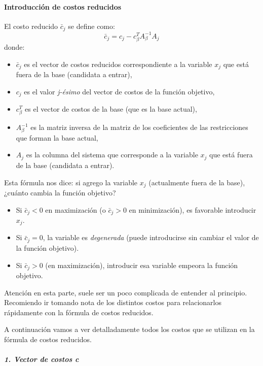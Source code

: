 \paragraph{Introducción de costos reducidos}

El costo reducido \(\bar{c}_j\) se define como:
\[
  \bar{c}_j = c_j - c_\beta^T A_\beta^{-1} A_j
\]
donde:
\begin{itemize}
  \item \(\bar{c}_j\) es el vector de costos reducidos correspondiente a la variable \(x_j\) que está fuera de la base (candidata a entrar),
  \item \(c_j\) es el valor \textit{j-ésimo} del vector de costos de la función objetivo,
  \item \(c_\beta^T\) es el vector de costos de la base (que es la base actual),
  \item \(A_\beta^{-1}\) es la matriz inversa de la matriz de los coeficientes de las restricciones que forman la base actual,
  \item \(A_j\) es la columna del sistema que corresponde a la variable \(x_j\) que está fuera de la base (candidata a entrar).
\end{itemize}

\noindent Esta fórmula nos dice: si agrego la variable \(x_j\) (actualmente fuera de la base), ¿cuánto cambia la función objetivo?
\begin{itemize}
  \item Si \(\bar{c}_j < 0\) en maximización (o \(\bar{c}_j > 0\) en minimización), es favorable introducir \(x_j\).
  \item Si \(\bar{c}_j = 0\), la variable es \textit{degenerada} (puede introducirse sin cambiar el valor de la función objetivo).
  \item Si \(\bar{c}_j > 0\) (en maximización), introducir esa variable empeora la función objetivo.
\end{itemize}

\begin{tcolorbox}[mydanger]
  Atención en esta parte, suele ser un poco complicada de entender al principio. Recomiendo ir tomando nota de los distintos costos para relacionarlos rápidamente con la fórmula de costos reducidos.
\end{tcolorbox}

\noindent A continuación vamos a ver detalladamente todos los costos que se utilizan en la fórmula de costos reducidos.

\subparagraph{1. Vector de costos \textit{c}}


